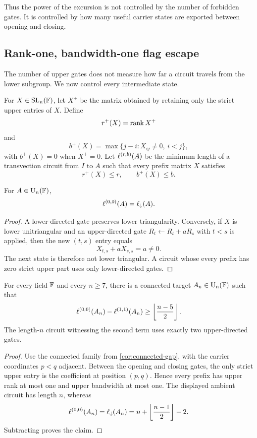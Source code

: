 Thus the power of the excursion is not controlled by the number of forbidden gates.  It is controlled by how many useful carrier states are exported between opening and closing.

\subsection{Rank-one, bandwidth-one flag escape}\label{subsec:microscopic-escape}

The number of upper gates does not measure how far a circuit travels from the lower subgroup.  We now control every intermediate state.

For $X\in\operatorname{SL}_n(\mathbb F)$, let $X^+$ be the matrix obtained by retaining only the strict upper entries of $X$.  Define
\[
r^+(X)=\operatorname{rank} X^+
\]
and
\[
b^+(X)=\max\{j-i:X_{ij}\ne0,\ i<j\},
\]
with $b^+(X)=0$ when $X^+=0$.  Let $\ell^{(r,b)}(A)$ be the minimum length of a transvection circuit from $I$ to $A$ such that every prefix matrix $X$ satisfies
\[
r^+(X)\le r,
\qquad
b^+(X)\le b.
\]

\begin{lemma}\label{lem:zero-excursion-equals-lower}
For $A\in\operatorname{U}_n(\mathbb F)$,
\[
\ell^{(0,0)}(A)=\ell_{\downarrow}(A).
\]
\end{lemma}

\begin{proof}
A lower-directed gate preserves lower triangularity.  Conversely, if $X$ is lower unitriangular and an upper-directed gate $R_t\leftarrow R_t+aR_s$ with $t<s$ is applied, then the new $(t,s)$ entry equals
\[
X_{t,s}+aX_{s,s}=a\ne0.
\]
The next state is therefore not lower triangular.  A circuit whose every prefix has zero strict upper part uses only lower-directed gates.
\end{proof}

\begin{theorem}\label{thm:microscopic-escape}
For every field $\mathbb F$ and every $n\ge7$, there is a connected target $A_n\in\operatorname{U}_n(\mathbb F)$ such that
\[
\ell^{(0,0)}(A_n)-\ell^{(1,1)}(A_n)
\ge
\left\lfloor\frac{n-5}{2}\right\rfloor.
\]
The length-$n$ circuit witnessing the second term uses exactly two upper-directed gates.
\end{theorem}

\begin{proof}
Use the connected family from \cref{cor:connected-gap}, with the carrier coordinates $p<q$ adjacent.  Between the opening and closing gates, the only strict upper entry is the coefficient at position $(p,q)$.  Hence every prefix has upper rank at most one and upper bandwidth at most one.  The displayed ambient circuit has length $n$, whereas
\[
\ell^{(0,0)}(A_n)=\ell_{\downarrow}(A_n)
=n+\left\lfloor\frac{n-1}{2}\right\rfloor-2.
\]
Subtracting proves the claim.
\end{proof}

